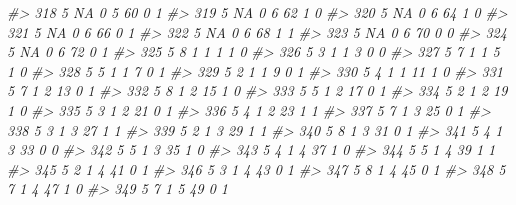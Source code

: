 \documentclass[]{book}
\newenvironment{Shaded}{\begin{snugshade}}{\end{snugshade}}
\newcommand{\CommentTok}[1]{\textcolor[rgb]{0.56,0.35,0.01}{\textit{#1}}}
\begin{document}
\begin{Shaded}
\begin{Highlighting}[]
\CommentTok{#> 318     5        NA         0     5    60           0            1}
\CommentTok{#> 319     5        NA         0     6    62           1            0}
\CommentTok{#> 320     5        NA         0     6    64           1            0}
\CommentTok{#> 321     5        NA         0     6    66           0            1}
\CommentTok{#> 322     5        NA         0     6    68           1            1}
\CommentTok{#> 323     5        NA         0     6    70           0            0}
\CommentTok{#> 324     5        NA         0     6    72           0            1}
\CommentTok{#> 325     5         8         1     1     1           1            0}
\CommentTok{#> 326     5         3         1     1     3           0            0}
\CommentTok{#> 327     5         7         1     1     5           1            0}
\CommentTok{#> 328     5         5         1     1     7           0            1}
\CommentTok{#> 329     5         2         1     1     9           0            1}
\CommentTok{#> 330     5         4         1     1    11           1            0}
\CommentTok{#> 331     5         7         1     2    13           0            1}
\CommentTok{#> 332     5         8         1     2    15           1            0}
\CommentTok{#> 333     5         5         1     2    17           0            1}
\CommentTok{#> 334     5         2         1     2    19           1            0}
\CommentTok{#> 335     5         3         1     2    21           0            1}
\CommentTok{#> 336     5         4         1     2    23           1            1}
\CommentTok{#> 337     5         7         1     3    25           0            1}
\CommentTok{#> 338     5         3         1     3    27           1            1}
\CommentTok{#> 339     5         2         1     3    29           1            1}
\CommentTok{#> 340     5         8         1     3    31           0            1}
\CommentTok{#> 341     5         4         1     3    33           0            0}
\CommentTok{#> 342     5         5         1     3    35           1            0}
\CommentTok{#> 343     5         4         1     4    37           1            0}
\CommentTok{#> 344     5         5         1     4    39           1            1}
\CommentTok{#> 345     5         2         1     4    41           0            1}
\CommentTok{#> 346     5         3         1     4    43           0            1}
\CommentTok{#> 347     5         8         1     4    45           0            1}
\CommentTok{#> 348     5         7         1     4    47           1            0}
\CommentTok{#> 349     5         7         1     5    49           0            1}

\end{Highlighting}
\end{Shaded}
\end{document}
